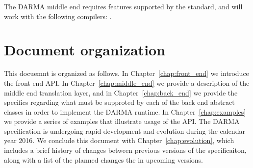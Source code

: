 The DARMA \gls{middle end} requires \CC features supported by the 
standard, and will work with the following compilers: .









\section{Document organization}
\label{sec:organization}
This docuemnt is organized as follows.  In Chapter~\ref{chap:front_end} we
introduce the \gls{front end} \gls{API}.  In Chapter~\ref{chap:middle_end} we
provide a description of the \gls{middle end} translation layer, and in
Chapter~\ref{chap:back_end} we provide the specifics regarding what must be
supproted by each of the \gls{back end} abstract classes in order to implement
the DARMA runtime. In Chapter~\ref{chap:examples} we provide a series of
examples that illustrate usage of the \gls{API}. The DARMA specification is
undergoing rapid development and evolution during the calendar year 2016.  
We conclude this document with
Chapter~\ref{chap:evolution}, which includes a brief history of changes between
previous versions of the specificaiton, along with a list of the planned changes the
in upcoming versions.


